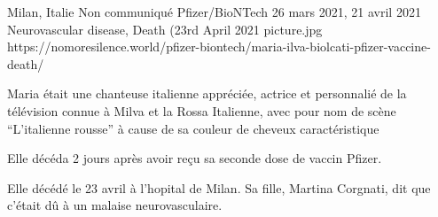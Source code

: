 {Milan, Italie}
{Non communiqué}
{Pfizer/BioNTech}
{26 mars 2021, 21 avril 2021}
{Neurovascular disease, Death (23rd April 2021}
{picture.jpg}
{https://nomoresilence.world/pfizer-biontech/maria-ilva-biolcati-pfizer-vaccine-death/}
{

Maria était une chanteuse italienne appréciée, actrice et personnalié de la
télévision connue à Milva et la Rossa Italienne, avec pour nom de scène
“L'italienne rousse” à cause de sa couleur de cheveux caractéristique

Elle décéda 2 jours après avoir reçu sa seconde dose de vaccin Pfizer.

Elle décédé le 23 avril à l'hopital de Milan. Sa fille, Martina Corgnati, dit
que c'était dû à un malaise neurovasculaire.

}

